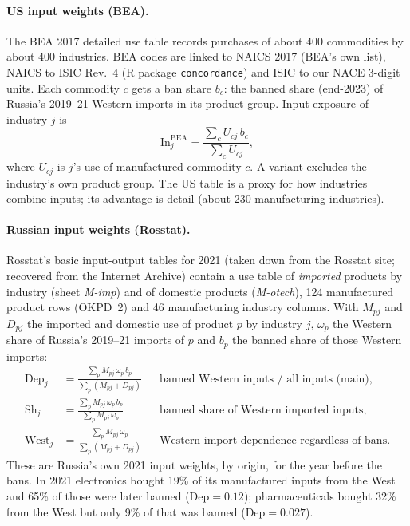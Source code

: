 \documentclass[11pt,a4paper]{article}
\begin{document}
\paragraph{US input weights (BEA).} The BEA 2017 detailed use table records purchases of about 400 commodities by
about 400 industries. BEA codes are linked to NAICS 2017 (BEA's own list), NAICS to ISIC Rev.~4 (R package
\texttt{concordance}) and ISIC to our NACE 3-digit units. Each commodity $c$ gets a ban share $b_c$: the banned share
(end-2023) of Russia's 2019--21 Western imports in its product group. Input exposure of industry $j$ is
\begin{equation}
  \mathrm{In}_j^{\mathrm{BEA}} = \frac{\sum_c U_{cj}\, b_c}{\sum_c U_{cj}},
\end{equation}
where $U_{cj}$ is $j$'s use of manufactured commodity $c$. A variant excludes the industry's own product group. The
US table is a proxy for how industries combine inputs; its advantage is detail (about 230 manufacturing industries).

\paragraph{Russian input weights (Rosstat).} Rosstat's basic input-output tables for 2021 (taken down from the
Rosstat site; recovered from the Internet Archive) contain a use table of \emph{imported} products by industry
(sheet \textit{M-imp}) and of domestic products (\textit{M-otech}), 124 manufactured product rows (OKPD~2) and 46 manufacturing industry
columns. With $M_{pj}$ and $D_{pj}$ the imported and domestic use of product $p$ by industry $j$, $\omega_p$ the
Western share of Russia's 2019--21 imports of $p$ and $b_p$ the banned share of those Western imports:
\begin{align}
  \mathrm{Dep}_j &= \frac{\sum_p M_{pj}\,\omega_p\, b_p}{\sum_p (M_{pj} + D_{pj})}
    && \text{banned Western inputs / all inputs (main)},\\
  \mathrm{Sh}_j &= \frac{\sum_p M_{pj}\,\omega_p\, b_p}{\sum_p M_{pj}\,\omega_p}
    && \text{banned share of Western imported inputs},\\
  \mathrm{West}_j &= \frac{\sum_p M_{pj}\,\omega_p}{\sum_p (M_{pj} + D_{pj})}
    && \text{Western import dependence regardless of bans}.
\end{align}
These are Russia's own 2021 input weights, by origin, for the year before the bans. In 2021 electronics bought 19\%
of its manufactured inputs from the West and 65\% of those were later banned ($\mathrm{Dep}=0.12$); pharmaceuticals
bought 32\% from the West but only 9\% of that was banned ($\mathrm{Dep}=0.027$).
\end{document}

